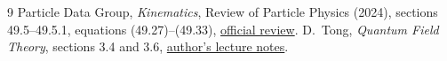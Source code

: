 \documentclass[11pt,a4paper]{article}
\begin{document}
\begin{thebibliography}{9}
Particle Data Group, \emph{Kinematics}, Review of Particle Physics
(2024), sections 49.5--49.5.1, equations (49.27)--(49.33),
\href{https://pdg.lbl.gov/2024/reviews/rpp2024-rev-kinematics.pdf}{official review}.
D.~Tong, \emph{Quantum Field Theory}, sections 3.4 and 3.6,
\href{https://www.damtp.cam.ac.uk/user/tong/qft/qfthtml/S3.html}{author's lecture notes}.
\end{thebibliography}
\end{document}
